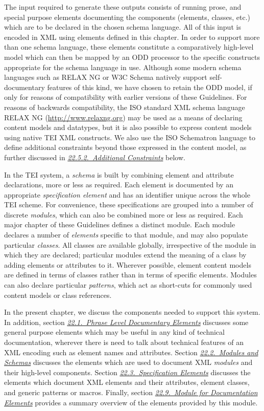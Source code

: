 The input required to generate these outputs consists of running prose, and special purpose elements documenting the components (elements, classes, etc.) which are to be declared in the chosen schema language. All of this input is encoded in XML using elements defined in this chapter. In order to support more than one schema language, these elements constitute a comparatively high-level model which can then be mapped by an ODD processor to the specific constructs appropriate for the schema language in use. Although some modern schema languages such as RELAX NG or W3C Schema natively support self-documentary features of this kind, we have chosen to retain the ODD model, if only for reasons of compatibility with earlier versions of these Guidelines. For reasons of backwards compatibility, the ISO standard XML schema language RELAX NG (\url{http://www.relaxng.org}) may be used as a means of declaring content models and datatypes, but it is also possible to express content models using native TEI XML constructs. We also use the ISO Schematron language to define additional constraints beyond those expressed in the content model, as further discussed in \textit{\hyperref[TDTAGCONS]{22.5.2.\ Additional Constraints}} below.\par
In the TEI system, a \textit{schema} is built by combining element and attribute declarations, more or less as required. Each element is documented by an appropriate \textit{specification element} and has an identifier unique across the whole TEI scheme. For convenience, these specifications are grouped into a number of discrete \textit{modules}, which can also be combined more or less as required. Each major chapter of these Guidelines defines a distinct module. Each module declares a number of \textit{elements} specific to that module, and may also populate particular \textit{classes}. All classes are available globally, irrespective of the module in which they are declared; particular modules extend the meaning of a class by adding elements or attributes to it. Wherever possible, element content models are defined in terms of classes rather than in terms of specific elements. Modules can also declare particular \textit{patterns}, which act as short-cuts for commonly used content models or class references.\par
In the present chapter, we discuss the components needed to support this system. In addition, section \textit{\hyperref[TDphrase]{22.1.\ Phrase Level Documentary Elements}} discusses some general purpose elements which may be useful in any kind of technical documentation, wherever there is need to talk about technical features of an XML encoding such as element names and attributes. Section \textit{\hyperref[TDmodules]{22.2.\ Modules and Schemas}} discusses the elements which are used to document XML \textit{modules} and their high-level components. Section \textit{\hyperref[TDcrystals]{22.3.\ Specification Elements}} discusses the elements which document XML elements and their attributes, element classes, and generic patterns or macros. Finally, section \textit{\hyperref[TDformal]{22.9.\ Module for Documentation Elements}} provides a summary overview of the elements provided by this module.
